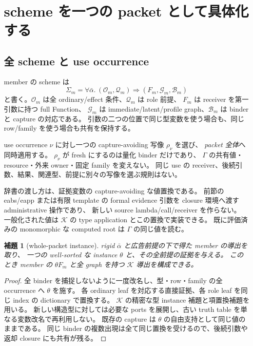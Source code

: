 \documentclass[11pt,a4paper]{article}
\newtheorem{lemma}[definition]{補題}
\newcommand{\Core}{\mathcal K}
\begin{document}
\section{scheme を一つの packet として具体化する}
\label{sec:scheme}

\subsection{全 scheme と use occurrence}

member の scheme は
\[
 \Sigma_m=\forall\bar\alpha.\ (\mathcal O_m,\mathcal Q_m)
          \Rightarrow(F_m,\mathcal G_m,\mathcal B_m)
\]
と書く。\(\mathcal O_m\) は全 ordinary/effect 条件、\(\mathcal Q_m\) は role 前提、
\(F_m\) は receiver を第一引数に持つ full Function、
\(\mathcal G_m\) は immediate/latent/profile graph、\(\mathcal B_m\) は binder と capture の対応である。
引数の二つの位置で同じ型変数を使う場合も、同じ row/family を使う場合も共有を保持する。

use occurrence \(\nu\) に対し一つの capture-avoiding 写像 \(\rho_\nu\) を選び、
\emph{packet 全体}へ同時適用する。
\(\rho_\nu\) が fresh にするのは量化 binder だけであり、
\(\Gamma\) の共有値・resource・外来 owner・固定 family を変えない。
同じ use の receiver、後続引数、結果、関連型、前提に別々の写像を選ぶ規則はない。

辞書の渡し方は、証拠変数の capture-avoiding な値置換である。
前節の eabs/eapp または有限 template の formal evidence 引数を closure 環境へ渡す administrative 操作であり、
新しい source lambda/call/receiver を作らない。
一般化された値は \(\Core\) の type application とこの置換で実装できる。
既に評価済みの monomorphic な computed root は \(\Gamma\) の同じ値を読む。

\begin{lemma}[whole-packet instance]
rigid \(\bar\alpha\) と広告前提の下で得た member の導出を取り、
一つの well-sorted な instance \(\theta\) と、その\emph{全}前提の証拠を与える。
このとき member の \(\theta F_m\) と全 graph を持つ \(\Core\) 導出を構成できる。
\end{lemma}
\begin{proof}
全 binder を捕捉しないように一度改名し、型・row・family の全 occurrence へ \(\theta\) を施す。
各 ordinary leaf を対応する直接証拠、各 role leaf を同じ index の dictionary で置換する。
\(\Core\) の精密な型 instance 補題と項置換補題を用いる。
新しい構造型に対しては必要な ports を展開し、古い truth table を単なる変数改名で再利用しない。
既存の capture は \(\theta\) の自由支持として同じ値のままである。
同じ binder の複数出現は全て同じ置換を受けるので、後続引数や返却 closure にも共有が残る。
\end{proof}
\end{document}
